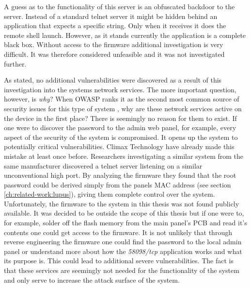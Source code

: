 A guess as to the functionality of this server is an obfuscated backdoor to the server. Instead of a standard telnet server it might be hidden behind an application that expects a specific string. Only when it receives it does the remote shell launch. However, as it stands currently the application is a complete black box. Without access to the firmware additional investigation is very difficult. It was therefore considered unfeasible and it was not investigated further.

As stated, no additional vulnerabilities were discovered as a result of this investigation into the systems network services. The more important question, however, is \textit{why}? When OWASP ranks it as the second most common source of security issues for this type of system \cite{owasp-iot-top10}, why are these network services active on the device in the first place? There is seemingly no reason for them to exist. If one were to discover the password to the admin web panel, for example, every aspect of the security of the system is compromised. It opens up the system to potentially critical vulnerabilities. Climax Technology have already made this mistake at least once before. Researchers investigating a similar system from the same manufacturer discovered a telnet server listening on a similar unconventional high port. By analyzing the firmware they found that the root password could be derived simply from the panels MAC address \cite{labvienna} (see section \ref{ch:related-work:lupus}), giving them complete control over the system. Unfortunately, the firmware to the system in this thesis was not found publicly available. It was decided to be outside the scope of this thesis but if one were to, for example, solder off the flash memory from the main panel's PCB and read it's contents one could get access to the firmware. It is not unlikely that through reverse engineering the firmware one could find the password to the local admin panel or understand more about how the \textit{58098/tcp} application works and what its purpose is. This could lead to additional severe vulnerabilities. The fact is that these services are seemingly not needed for the functionality of the system and only serve to increase the attack surface of the system.
